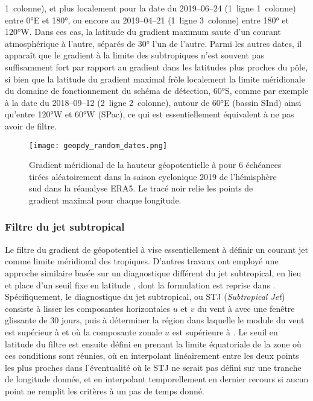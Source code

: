 \documentclass[../main.tex]{subfiles}
\begin{document}
1\iere~colonne), et plus localement pour la date du 2019--06--24 (1\iere~ligne 1\iere~colonne) entre \ang{0}E et \ang{180}, ou encore au 2019--04--21
(1\iere~ligne 3\ieme~colonne) entre \ang{180} et \ang{120}W. Dans ces cas, la latitude du gradient maximum saute d'un courant atmosphérique à l'autre, séparés
de \ang{30} l'un de l'autre. Parmi les autres dates, il apparaît que le gradient à la limite des subtropiques n'est souvent pas suffisamment fort par rapport au
gradient dans les latitudes plus proches du pôle, si bien que la latitude du gradient maximal frôle localement la limite méridionale du domaine de
fonctionnement du schéma de détection, \ang{60}S, comme par exemple à la date du 2018--09--12 (2\ieme~ligne 2\ieme~colonne), autour de \ang{60}E (bassin SInd)
ainsi qu'entre \ang{120}W et \ang{60}W (SPac), ce qui est essentiellement équivalent à ne pas avoir de filtre.
%
\begin{figure}[tb]
    \centering
    \texttt{[image: geopdy\_random\_dates.png]}
    \caption{Gradient méridional de la hauteur géopotentielle à  pour 6 échéances tirées aléatoirement dans la saison cyclonique 2019 de l'hémisphère
    sud dans la réanalyse ERA5. Le tracé noir relie les points de gradient maximal pour chaque longitude.}
    \label{fig:geopdy_random}
\end{figure}

\subsubsection*{Filtre du jet subtropical}

Le filtre du gradient de géopotentiel à  vise essentiellement à définir un courant jet comme limite méridional des tropiques. D'autres travaux ont
employé une approche similaire basée sur un diagnostique différent du jet subtropical, en lieu et place d'un seuil fixe en latitude
\parencite{tory_projected_2013,tory_sea_2015,bell_statistical_2018}, dont la formulation est reprise dans \textcite{bourdin_intercomparison_2022}. Spécifiquement,
le diagnostique du jet subtropical, ou STJ (\textit{Subtropical Jet}) consiste à lisser les composantes horizontales $u$ et $v$ du vent à  avec une
fenêtre glissante de 30 jours, puis à déterminer la région dans laquelle le module du vent est supérieur à  et où la composante zonale $u$ est supérieure
à . Le seuil en latitude du filtre est ensuite défini en prenant la limite équatoriale de la zone où ces conditions sont réunies, où en interpolant
linéairement entre les deux points les plus proches dans l'éventualité où le STJ ne serait pas défini sur une tranche de longitude donnée, et en interpolant
temporellement en dernier recours si aucun point ne remplit les critères à un pas de temps donné. 
\end{document}
